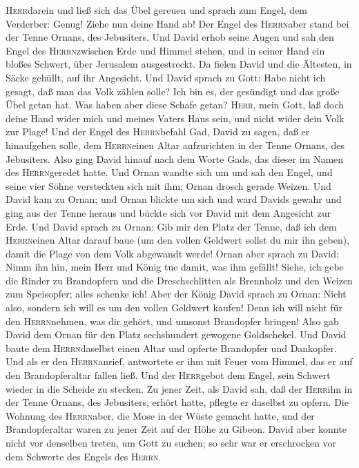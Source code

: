 \textsc{Herr}darein und ließ sich das Übel gereuen und sprach zum Engel,
dem Verderber: Genug! Ziehe nun deine Hand ab! Der Engel des
\textsc{Herrn}aber stand bei der Tenne Ornans, des Jebusiters.
 Und David erhob seine Augen und sah den Engel des
\textsc{Herrn}zwischen Erde und Himmel stehen, und in seiner Hand ein
bloßes Schwert, über Jerusalem ausgestreckt. Da fielen David und die
Ältesten, in Säcke gehüllt, auf ihr Angesicht.  Und David
sprach zu Gott: Habe nicht ich gesagt, daß man das Volk zählen solle?
Ich bin es, der gesündigt und das große Übel getan hat. Was haben aber
diese Schafe getan? \textsc{Herr}, mein Gott, laß doch deine Hand wider
mich und meines Vaters Haus sein, und nicht wider dein Volk zur Plage!
 Und der Engel des \textsc{Herrn}befahl Gad, David zu
sagen, daß er hinaufgehen solle, dem \textsc{Herrn}einen Altar
aufzurichten in der Tenne Ornans, des Jebusiters.  Also
ging David hinauf nach dem Worte Gads, das dieser im Namen des
\textsc{Herrn}geredet hatte.  Und Ornan wandte sich um
und sah den Engel, und seine vier Söhne versteckten sich mit ihm; Ornan
drosch gerade Weizen.  Und David kam zu Ornan; und Ornan
blickte um sich und ward Davids gewahr und ging aus der Tenne heraus und
bückte sich vor David mit dem Angesicht zur Erde.  Und
David sprach zu Ornan: Gib mir den Platz der Tenne, daß ich dem
\textsc{Herrn}einen Altar darauf baue (um den vollen Geldwert sollst du
mir ihn geben), damit die Plage von dem Volk abgewandt werde!
 Ornan aber sprach zu David: Nimm ihn hin, mein Herr und
König tue damit, was ihm gefällt! Siehe, ich gebe die Rinder zu
Brandopfern und die Dreschschlitten als Brennholz und den Weizen zum
Speisopfer; alles schenke ich!  Aber der König David
sprach zu Ornan: Nicht also, sondern ich will es um den vollen Geldwert
kaufen! Denn ich will nicht für den \textsc{Herrn}nehmen, was dir
gehört, und umsonst Brandopfer bringen!  Also gab David
dem Ornan für den Platz sechshundert gewogene Goldschekel.
 Und David baute dem \textsc{Herrn}daselbst einen Altar
und opferte Brandopfer und Dankopfer. Und als er den
\textsc{Herrn}anrief, antwortete er ihm mit Feuer vom Himmel, das er auf
den Brandopferaltar fallen ließ.  Und der
\textsc{Herr}gebot dem Engel, sein Schwert wieder in die Scheide zu
stecken.  Zu jener Zeit, als David sah, daß der
\textsc{Herr}ihn in der Tenne Ornans, des Jebusiters, erhört hatte,
pflegte er daselbst zu opfern.  Die Wohnung des
\textsc{Herrn}aber, die Mose in der Wüste gemacht hatte, und der
Brandopferaltar waren zu jener Zeit auf der Höhe zu Gibeon.
 David aber konnte nicht vor denselben treten, um Gott zu
suchen; so sehr war er erschrocken vor dem Schwerte des Engels des
\textsc{Herrn}.

